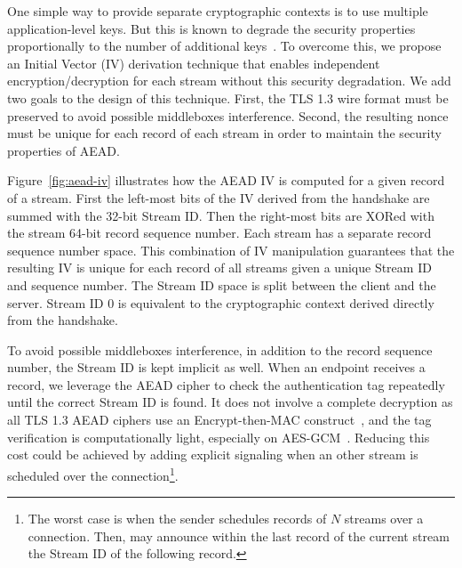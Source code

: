 One simple way to provide separate cryptographic contexts is to use multiple
application-level keys. But this is known to degrade the security properties
proportionally to the number of additional keys~\cite{chatterjee2011another}. To
overcome this, we propose an Initial Vector (IV) derivation technique that
enables independent encryption/decryption for each stream without this security
degradation. We add two goals to the design of this technique. First, the 
TLS 1.3 wire format must be preserved to avoid possible middleboxes 
interference. Second, the resulting nonce must be unique for each record of 
each stream in order to maintain the security properties of AEAD.

Figure~\ref{fig:aead-iv} illustrates how the AEAD IV is computed for a given
\tcpls record of a \tcpls stream. First the left-most bits of the IV derived
from the \tls handshake are summed with the 32-bit \tcpls Stream ID. Then the
right-most bits are XORed with the stream 64-bit record sequence number. Each
\tcpls stream has a separate record sequence number space. This combination of
IV manipulation guarantees that the resulting IV is unique for each record of
all \tcpls streams given a unique Stream ID and sequence number. The 
Stream ID space is split between the client
and the server. Stream ID 0 is equivalent to the cryptographic context
derived directly from the handshake.

To avoid possible middleboxes interference, in addition to the record sequence
number, the \tcpls Stream ID is kept implicit as well. When an endpoint receives
a \tcpls record, we leverage the AEAD cipher to check the authentication tag
repeatedly until the correct \tcpls Stream ID is found. 
It does not involve a complete decryption as all TLS 1.3 AEAD
ciphers use an Encrypt-then-MAC construct~\cite{rfc7366, rfc8446}, and the tag
verification is computationally light, especially on 
AES-GCM~\cite{mcgrew2004galois}. Reducing this cost could be achieved by adding 
explicit signaling when an other stream is scheduled over the \tcp connection\footnote{
The worst case is when the sender schedules records of $N$ streams 
over a \tcp connection. Then,
  \tcpls may announce within the last record of the current stream the Stream 
  ID of the following record.%
}.

